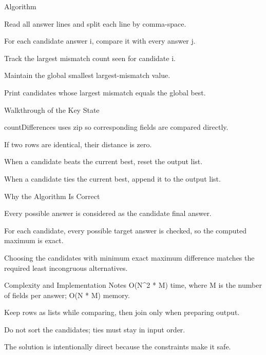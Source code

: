 \documentclass[aspectratio=169,11pt]{beamer}
\begin{document}
\begin{frame}{Algorithm}
\begin{tightitemize}
  \item Read all answer lines and split each line by comma-space.
  \item For each candidate answer i, compare it with every answer j.
  \item Track the largest mismatch count seen for candidate i.
  \item Maintain the global smallest largest-mismatch value.
  \item Print candidates whose largest mismatch equals the global best.
\end{tightitemize}
\end{frame}

\begin{frame}{Walkthrough of the Key State}
\begin{tightitemize}
  \item countDifferences uses zip so corresponding fields are compared directly.
  \item If two rows are identical, their distance is zero.
  \item When a candidate beats the current best, reset the output list.
  \item When a candidate ties the current best, append it to the output list.
\end{tightitemize}
\end{frame}

\begin{frame}{Why the Algorithm Is Correct}
\begin{tightitemize}
  \item Every possible answer is considered as the candidate final answer.
  \item For each candidate, every possible target answer is checked, so the computed maximum is exact.
  \item Choosing the candidates with minimum exact maximum difference matches the required least incongruous alternatives.
\end{tightitemize}
\end{frame}

\begin{frame}{Complexity and Implementation Notes}
\small
{} O(N\textasciicircum{}2 * M) time, where M is the number of fields per answer; O(N * M) memory.

\vspace{0.3cm}
\begin{tightitemize}
  \item Keep rows as lists while comparing, then join only when preparing output.
  \item Do not sort the candidates; ties must stay in input order.
  \item The solution is intentionally direct because the constraints make it safe.
\end{tightitemize}
\end{frame}
\end{document}
